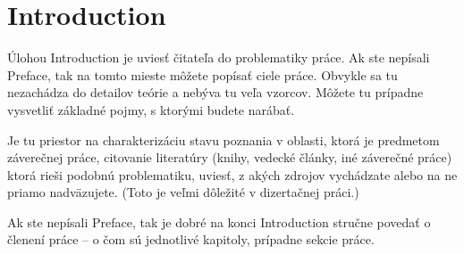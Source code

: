 \chapter{Introduction}

Úlohou Introduction je uviesť čitateľa do problematiky práce. Ak ste nepísali Preface, tak na tomto mieste môžete popísať ciele práce. Obvykle sa tu nezachádza do detailov teórie a nebýva tu veľa vzorcov. Môžete tu prípadne vysvetliť základné pojmy, s ktorými budete narábať.

Je tu priestor na charakterizáciu stavu poznania v oblasti, ktorá je predmetom záverečnej práce, citovanie literatúry (knihy, vedecké články, iné záverečné práce) ktorá rieši podobnú problematiku, uviesť, z akých zdrojov vychádzate alebo na ne priamo nadväzujete. (Toto je veľmi dôležité v dizertačnej práci.)

Ak ste nepísali Preface, tak je dobré  na konci Introduction stručne povedať o členení práce -- o čom sú jednotlivé kapitoly, prípadne sekcie práce.
